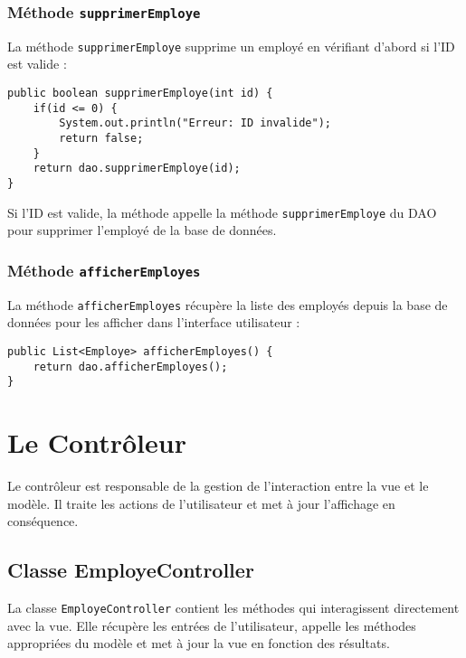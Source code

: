 \documentclass[a4paper,12pt]{report}
\begin{document}
\subsubsection{Méthode \texttt{supprimerEmploye}}
La méthode \texttt{supprimerEmploye} supprime un employé en vérifiant d'abord si l'ID est valide :
\begin{verbatim}
public boolean supprimerEmploye(int id) {
    if(id <= 0) {
        System.out.println("Erreur: ID invalide");
        return false;
    }
    return dao.supprimerEmploye(id);
}
\end{verbatim}
Si l'ID est valide, la méthode appelle la méthode \texttt{supprimerEmploye} du DAO pour supprimer l'employé de la base de données.

\subsubsection{Méthode \texttt{afficherEmployes}}
La méthode \texttt{afficherEmployes} récupère la liste des employés depuis la base de données pour les afficher dans l'interface utilisateur :
\begin{verbatim}
public List<Employe> afficherEmployes() {
    return dao.afficherEmployes();
}
\end{verbatim}

\section{Le Contrôleur}
Le contrôleur est responsable de la gestion de l'interaction entre la vue et le modèle. Il traite les actions de l'utilisateur et met à jour l'affichage en conséquence.

\subsection{Classe EmployeController}
La classe \texttt{EmployeController} contient les méthodes qui interagissent directement avec la vue. Elle récupère les entrées de l'utilisateur, appelle les méthodes appropriées du modèle et met à jour la vue en fonction des résultats.
\end{document}
